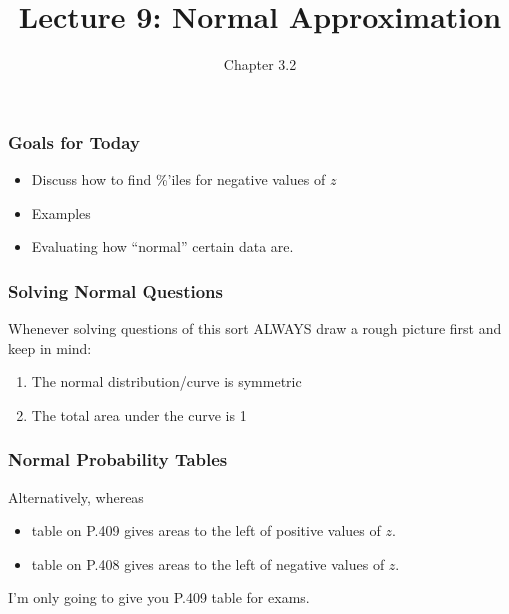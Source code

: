 \documentclass[slides]{beamer}
\title{Lecture 9: Normal Approximation}
\author{Chapter 3.2}
\date{}
\newcommand{\blue}[1]{\textcolor{blue2}{#1}}
\begin{document}
\begin{frame}
\titlepage
\end{frame}


\begin{frame}[fragile]
\frametitle{Goals for Today}

\begin{itemize}
\item Discuss how to find \%'iles for negative values of $z$
\item Examples
\item Evaluating how ``normal'' certain data are.  
\end{itemize}

\end{frame}


\begin{frame}
\frametitle{Solving Normal Questions}
Whenever solving questions of this sort \blue{ALWAYS} draw a rough picture first and keep in mind:
\begin{enumerate}
\item The normal distribution/curve is \blue{symmetric}
\item The total area under the curve is 1
\end{enumerate}

\end{frame}


\begin{frame}
\frametitle{Normal Probability Tables}
Alternatively, whereas 
\begin{itemize}
\item table on P.409 gives areas to the left of positive values of $z$.
\item table on P.408 gives areas to the left of negative values of $z$.
\end{itemize}

\vspace{0.5cm}
I'm only going to give you P.409 table for exams.

\end{frame}
\end{document}
